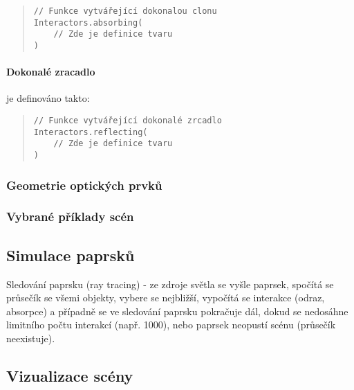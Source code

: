 \begin{minipage}{\textwidth}\begin{quote}\begin{lstlisting}
// Funkce vytvářející dokonalou clonu
Interactors.absorbing(
    // Zde je definice tvaru
)
\end{lstlisting}\end{quote}\end{minipage}
    

\paragraph{Dokonalé zracadlo} je definováno takto:

\begin{minipage}{\textwidth}\begin{quote}\begin{lstlisting}
// Funkce vytvářející dokonalé zrcadlo
Interactors.reflecting(
    // Zde je definice tvaru
)
\end{lstlisting}\end{quote}\end{minipage}


\subsubsection{Geometrie optických prvků}




\subsubsection{Vybrané příklady scén}



\subsection{Simulace paprsků}


Sledování paprsku (ray tracing) - ze zdroje světla se vyšle paprsek,
spočítá se průsečík se všemi objekty, vybere se nejbližší, vypočítá se
interakce (odraz, absorpce) a případně se ve sledování paprsku pokračuje
dál, dokud se nedosáhne limitního počtu interakcí (např. 1000), nebo
paprsek neopustí scénu (průsečík neexistuje).


\subsection{Vizualizace scény}

